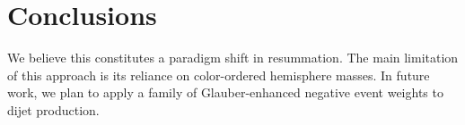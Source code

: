 \section{Conclusions}\label{sec:conclusions}

We believe this constitutes a paradigm shift in resummation. The main
limitation of this approach is its reliance on color-ordered hemisphere
masses. In future work, we plan to apply a family of Glauber-enhanced
negative event weights to dijet production.

